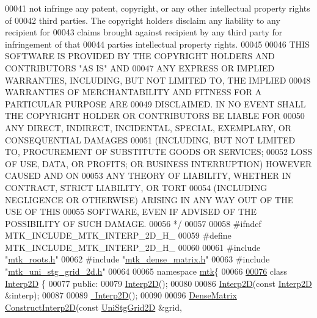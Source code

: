 \begin{DoxyCode}
00041 \textcolor{comment}{not infringe any patent, copyright, or any other intellectual property rights of}
00042 \textcolor{comment}{third parties. The copyright holders disclaim any liability to any recipient for}
00043 \textcolor{comment}{claims brought against recipient by any third party for infringement of that}
00044 \textcolor{comment}{parties intellectual property rights.}
00045 \textcolor{comment}{}
00046 \textcolor{comment}{THIS SOFTWARE IS PROVIDED BY THE COPYRIGHT HOLDERS AND CONTRIBUTORS "AS IS" AND}
00047 \textcolor{comment}{ANY EXPRESS OR IMPLIED WARRANTIES, INCLUDING, BUT NOT LIMITED TO, THE IMPLIED}
00048 \textcolor{comment}{WARRANTIES OF MERCHANTABILITY AND FITNESS FOR A PARTICULAR PURPOSE ARE}
00049 \textcolor{comment}{DISCLAIMED. IN NO EVENT SHALL THE COPYRIGHT HOLDER OR CONTRIBUTORS BE LIABLE FOR}
00050 \textcolor{comment}{ANY DIRECT, INDIRECT, INCIDENTAL, SPECIAL, EXEMPLARY, OR CONSEQUENTIAL DAMAGES}
00051 \textcolor{comment}{(INCLUDING, BUT NOT LIMITED TO, PROCUREMENT OF SUBSTITUTE GOODS OR SERVICES;}
00052 \textcolor{comment}{LOSS OF USE, DATA, OR PROFITS; OR BUSINESS INTERRUPTION) HOWEVER CAUSED AND ON}
00053 \textcolor{comment}{ANY THEORY OF LIABILITY, WHETHER IN CONTRACT, STRICT LIABILITY, OR TORT}
00054 \textcolor{comment}{(INCLUDING NEGLIGENCE OR OTHERWISE) ARISING IN ANY WAY OUT OF THE USE OF THIS}
00055 \textcolor{comment}{SOFTWARE, EVEN IF ADVISED OF THE POSSIBILITY OF SUCH DAMAGE.}
00056 \textcolor{comment}{*/}
00057 
00058 \textcolor{preprocessor}{#ifndef MTK\_INCLUDE\_MTK\_INTERP\_2D\_H\_}
00059 \textcolor{preprocessor}{#define MTK\_INCLUDE\_MTK\_INTERP\_2D\_H\_}
00060 
00061 \textcolor{preprocessor}{#include "\hyperlink{mtk__roots_8h}{mtk\_roots.h}"}
00062 \textcolor{preprocessor}{#include "\hyperlink{mtk__dense__matrix_8h}{mtk\_dense\_matrix.h}"}
00063 \textcolor{preprocessor}{#include "\hyperlink{mtk__uni__stg__grid__2d_8h}{mtk\_uni\_stg\_grid\_2d.h}"}
00064 
00065 \textcolor{keyword}{namespace }\hyperlink{namespacemtk}{mtk}\{
00066 
\hypertarget{mtk__interp__2d_8h_source_l00076}{}\hyperlink{classmtk_1_1Interp2D}{00076} \textcolor{keyword}{class }\hyperlink{classmtk_1_1Interp2D}{Interp2D} \{
00077  \textcolor{keyword}{public}:
00079   \hyperlink{classmtk_1_1Interp2D_a1ced84c0dbafdbe1cd3732d5a4848e10}{Interp2D}();
00080 
00086   \hyperlink{classmtk_1_1Interp2D_a1ced84c0dbafdbe1cd3732d5a4848e10}{Interp2D}(\textcolor{keyword}{const} \hyperlink{classmtk_1_1Interp2D}{Interp2D} &interp);
00087 
00089   \hyperlink{classmtk_1_1Interp2D_a037ed312b0baa2137a31984108e6907d}{~Interp2D}();
00090 
00096   \hyperlink{classmtk_1_1DenseMatrix}{DenseMatrix} \hyperlink{classmtk_1_1Interp2D_ae9a83433caa1fd62956cce0872a02fb8}{ConstructInterp2D}(\textcolor{keyword}{const} \hyperlink{classmtk_1_1UniStgGrid2D}{UniStgGrid2D} &grid,

\end{DoxyCode}
